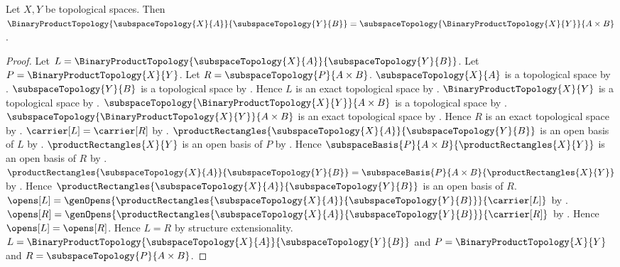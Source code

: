\begin{theorem}\label{product_of_subspaces}
    Let $X,Y$ be topological spaces.
    Then
        $\BinaryProductTopology{
            \subspaceTopology{X}{A}}{\subspaceTopology{Y}{B}}
        =\subspaceTopology{\BinaryProductTopology{X}{Y}}{A\times B}$.
\end{theorem}
\begin{proof}
    Let $L=\BinaryProductTopology{
        \subspaceTopology{X}{A}}{\subspaceTopology{Y}{B}}$.
    Let $P=\BinaryProductTopology{X}{Y}$.
    Let $R=\subspaceTopology{P}{A\times B}$.
    $\subspaceTopology{X}{A}$ is a topological space by
        .
    $\subspaceTopology{Y}{B}$ is a topological space by
        .
    Hence $L$ is an exact topological space by
        .
    $\BinaryProductTopology{X}{Y}$ is a topological space by
        .
    $\subspaceTopology{\BinaryProductTopology{X}{Y}}{A\times B}$ is a
        topological space by
        .
    $\subspaceTopology{\BinaryProductTopology{X}{Y}}{A\times B}$ is an
        exact topological space by .
    Hence $R$ is an exact topological space by \auto.
    $\carrier[L]=\carrier[R]$ by
        .
    $\productRectangles{
        \subspaceTopology{X}{A}}{\subspaceTopology{Y}{B}}$ is an open
        basis of $L$ by .
    $\productRectangles{X}{Y}$ is an open basis of $P$ by
        .
    Hence $\subspaceBasis{P}{A\times B}{\productRectangles{X}{Y}}$ is
        an open basis of $R$ by .
    $\productRectangles{
        \subspaceTopology{X}{A}}{\subspaceTopology{Y}{B}}
        =\subspaceBasis{P}{A\times B}{\productRectangles{X}{Y}}$ by
        .
    Hence $\productRectangles{
        \subspaceTopology{X}{A}}{\subspaceTopology{Y}{B}}$ is an open
        basis of $R$.
    $\opens[L]=\genOpens{
        \productRectangles{
            \subspaceTopology{X}{A}}{\subspaceTopology{Y}{B}}}{
        \carrier[L]}$ by .
    $\opens[R]=\genOpens{
        \productRectangles{
            \subspaceTopology{X}{A}}{\subspaceTopology{Y}{B}}}{
        \carrier[R]}$ by .
    Hence $\opens[L]=\opens[R]$.
    Hence $L=R$ by structure extensionality.
    $L=\BinaryProductTopology{
        \subspaceTopology{X}{A}}{\subspaceTopology{Y}{B}}$ and
        $P=\BinaryProductTopology{X}{Y}$ and
        $R=\subspaceTopology{P}{A\times B}$.
\end{proof}
